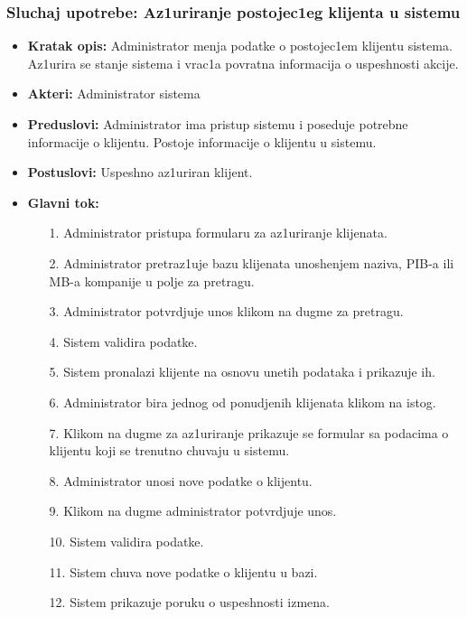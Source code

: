 \subsubsection{Sluchaj upotrebe: Az1uriranje postojec1eg klijenta u sistemu}

\begin{itemize}
\item{\textbf{Kratak opis:} Administrator menja podatke o postojec1em klijentu sistema. Az1urira se stanje sistema i vrac1a povratna informacija o uspeshnosti akcije.}
\item{\textbf{Akteri:} Administrator sistema}

\item{\textbf{Preduslovi:} Administrator ima pristup sistemu i poseduje potrebne informacije o klijentu. Postoje informacije o klijentu u sistemu.}
\item{\textbf{Postuslovi:} Uspeshno az1uriran klijent.}
\item{\textbf{Glavni tok:} 
\begin{enumerate}
    \item [1.] Administrator pristupa formularu za az1uriranje klijenata.
    \item[2.] Administrator pretraz1uje bazu klijenata unoshenjem naziva, PIB-a ili MB-a kompanije u polje za pretragu.
    \item[3.] Administrator potvrdjuje unos klikom na dugme za pretragu.
    \item[4.] Sistem validira podatke.
    \item[5.] Sistem pronalazi klijente na osnovu unetih podataka i prikazuje ih.
    \item[6.] Administrator bira jednog od ponudjenih klijenata klikom na istog.
    \item[7.] Klikom na dugme za az1uriranje prikazuje se formular sa podacima o klijentu koji se trenutno chuvaju u sistemu.
    \item[8.] Administrator unosi nove podatke o klijentu.
    \item[9.] Klikom na dugme administrator potvrdjuje unos.
    \item[10.] Sistem validira podatke.
    \item[11.] Sistem chuva nove podatke o klijentu u bazi.
    \item[12.] Sistem prikazuje poruku o uspeshnosti izmena.
\end{enumerate}

}
\end{itemize}
